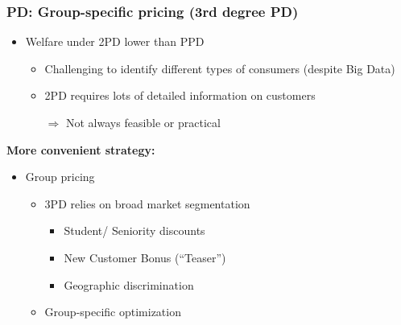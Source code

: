 \documentclass[10pt]{beamer}
\begin{document}
\begin{frame} 
	\frametitle{PD: Group-specific pricing (3rd degree PD)}
	
\begin{itemize}
		\item Welfare under 2PD lower than PPD %
		\begin{itemize}
			\item Challenging to identify different types of consumers (despite Big Data)
			\item 2PD requires lots of detailed information on customers 
		\end{itemize}
		
	\begin{itemize}
		\item [$\Longrightarrow$] Not always feasible or practical
	\end{itemize}
\end{itemize}


\bigskip

\textbf{More convenient strategy:}
	
	\begin{itemize}
		
		\item Group pricing 
		\begin{itemize}
			\item 3PD relies on broad market segmentation
				\begin{itemize}
					\item Student/ Seniority discounts
					\item New Customer Bonus (``Teaser'')%
					\item Geographic discrimination%
				\end{itemize}
			\item Group-specific optimization
		\end{itemize}
	\end{itemize}
	

	
\end{frame}
\end{document}
